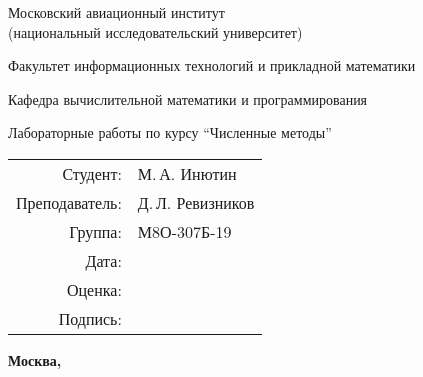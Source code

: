 \begin{titlepage}
\begin{center}
\bfseries

{\Large Московский авиационный институт \\ (национальный исследовательский университет)

}

\vspace{48pt}

{\large Факультет информационных технологий и прикладной математики
}

\vspace{36pt}

{\large Кафедра вычислительной математики и программирования

}

\vspace{48pt}

Лабораторные работы по курсу \enquote{Численные методы}

\end{center}

\vspace{72pt}

\begin{flushright}
\begin{tabular}{rl}
Студент: & М.\,А. Инютин \\
Преподаватель: & Д.\,Л. Ревизников \\
Группа: & М8О-307Б-19 \\
Дата: & \\
Оценка: & \\
Подпись: & \\
\end{tabular}
\end{flushright}

\vfill

\begin{center}
\bfseries
Москва, \the\year
\end{center}
\end{titlepage}

\pagebreak
